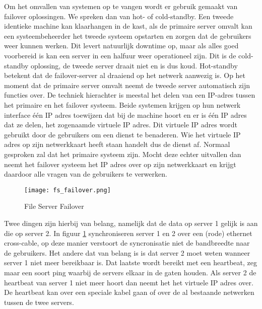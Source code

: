 Om het omvallen van systemen op te vangen wordt er gebruik gemaakt van failover oplossingen. We spreken dan van hot- of cold-standby. Een tweede identieke machine kan klaarhangen in de kast, als de primaire server omvalt kan een systeembeheerder het tweede systeem opstarten en zorgen dat de gebruikers weer kunnen werken. Dit levert natuurlijk downtime op, maar als alles goed voorbereid is kan een server in een halfuur weer operationeel zijn. Dit is de cold-standby oplossing, de tweede server draait niet en is dus koud.
Hot-standby betekent dat de failover-server al draaiend op het netwerk aanwezig is. Op het moment dat de primaire server omvalt neemt de tweede server automatisch zijn functies over. De techniek hierachter is meestal het delen van een IP-adres tussen het primaire en het failover systeem. Beide systemen krijgen op hun netwerk interface \'e\'en IP adres toewijzen dat bij de machine hoort en er is \'e\'en IP adres dat ze delen, het zogenaamde virtuele IP adres. Dit virtuele IP adres wordt gebruikt door de gebruikers om een dienst te benaderen. Wie het virtuele IP adres op zijn netwerkkaart heeft staan handelt dus de dienst af. Normaal gesproken zal dat het primaire systeem zijn. Mocht deze echter uitvallen dan neemt het failover systeem het IP adres over op zijn netwerkkaart en krijgt daardoor alle vragen van de gebruikers te verwerken.

\begin{figure}[H]
	\texttt{[image: fs\_failover.png]}
	\caption{File Server Failover}
	\label{FS_failover}
\end{figure}

Twee dingen zijn hierbij van belang, namelijk dat de data op server 1 gelijk is aan die op server 2. In figuur \ref{FS_failover} synchroniseren server 1 en 2 over een (rode) ethernet cross-cable, op deze manier verstoort de syncronisatie niet de bandbreedte naar de gebruikers. Het andere dat van belang is is dat server 2 moet weten wanneer server 1 niet meer bereikbaar is. Dat laatste wordt bereikt met een heartbeat, zeg maar een soort ping waarbij de servers elkaar in de gaten houden. Als server 2 de heartbeat van server 1 niet meer hoort dan neemt het het virtuele IP adres over. De heartbeat kan over een speciale kabel gaan of over de al bestaande netwerken tussen de twee servers.
